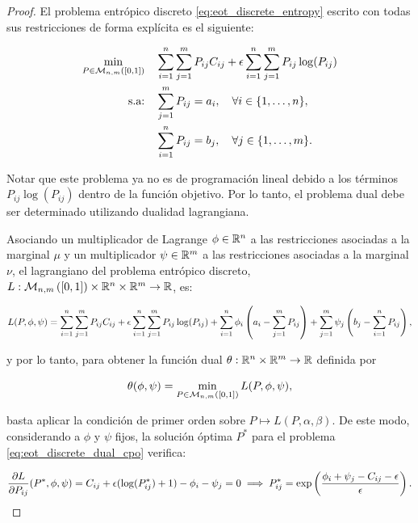 \begin{proof}
	
	El problema entrópico discreto \eqref{eq:eot_discrete_entropy} escrito con todas sus restricciones de forma explícita es el siguiente:

	\begin{align*}
		\min_{P\in\mathcal{M}_{n,m}\left([0,1]\right)} \quad & \sum_{i=1}^n\sum_{j=1}^m P_{ij}C_{ij} + \epsilon\sum_{i=1}^n\sum_{j=1}^m P_{ij}\log(P_{ij}) \\
		\text{s.a:} \quad                         & \sum_{j=1}^m P_{ij} = a_i,\quad \forall i\in\{1,\ldots,n\},                                 \\
		                                          & \sum_{i=1}^n P_{ij} = b_j,\quad \forall j\in\{1,\ldots,m\}.
	\end{align*}

	Notar que este problema ya no es de programación lineal debido a los términos $P_{ij}\log(P_{ij})$ dentro de la función objetivo. Por lo tanto, el problema dual debe ser determinado utilizando dualidad lagrangiana.


	Asociando un multiplicador de Lagrange $\phi\in\mathbb{R}^n$ a las restricciones asociadas a la marginal $\mu$ y un multiplicador $\psi\in\mathbb{R}^m$ a las restricciones asociadas a la marginal $\nu$, el lagrangiano del problema entrópico discreto, $L:\mathcal{M}_{n,m}\left([0,1]\right)\times\mathbb{R}^n\times\mathbb{R}^m\to\mathbb{R}$, es:

	\begin{equation*}
		L(P,\phi,\psi) = \sum_{i=1}^n\sum_{j=1}^m P_{ij}C_{ij} + \epsilon\sum_{i=1}^n\sum_{j=1}^m P_{ij}\log(P_{ij}) + \sum_{i=1}^n \phi_i \left(a_i - \sum_{j=1}^m P_{ij}\right) + \sum_{j=1}^m \psi_j \left(b_j - \sum_{i=1}^n P_{ij}\right),
	\end{equation*}

	y por lo tanto, para obtener la función dual $\theta:\mathbb{R}^n\times\mathbb{R}^m\to\mathbb{R}$ definida por

	\begin{equation}
		\label{eq:eot_discrete_dual_cpo}
		\theta(\phi,\psi)= \min_{P\in\mathcal{M}_{n,m}\left([0,1]\right)} L(P,\phi,\psi),
	\end{equation}

	basta aplicar la condición de primer orden sobre $P\mapsto L(P,\alpha,\beta)$. De este modo, considerando a $\phi$ y $\psi$ fijos, la solución óptima $P^*$ para el problema \eqref{eq:eot_discrete_dual_cpo} verifica:

	\begin{align*}
		\frac{\partial L}{\partial P_{ij}}(P^*,\phi,\psi) = C_{ij} + \epsilon(\log(P_{ij}^*)+1) - \phi_i - \psi_j = 0 \implies P_{ij}^* = \exp\left(\frac{\phi_i + \psi_j-C_{ij} - \epsilon}{\epsilon}\right).
	\end{align*}


\end{proof}
